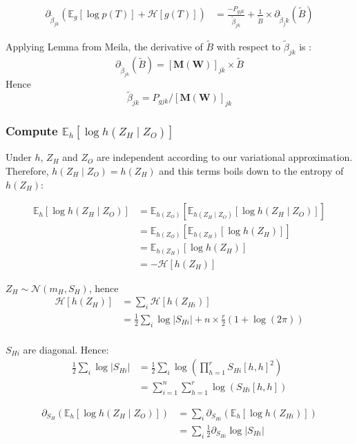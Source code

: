 \documentclass[11pt,a4paper]{article}
\newcommand{\Esp}{\mathds{E}}
\newcommand{\entr}{\mathcal{H}}
\begin{document}
\begin{align*}
\partial_{\widetilde{\beta}_{jk}} \left(\Esp_g[\log p(T)] + \entr[g(T)]\right) &= \frac{-P_{gjk}}{\widetilde{\beta}_{jk}} + \frac{1}{\widetilde{B}} \times \partial_{\widetilde{\beta}_jk} (\widetilde{B})
\end{align*}

Applying Lemma from Meila, the derivative of $\widetilde{B}$ with respect to $\widetilde{\beta}_{jk}$ is :
$$\partial_{\widetilde{\beta}_{jk}} (\widetilde{B}) = [\bm{M}(\bm{W})]_{jk} \times \widetilde{B}  $$
Hence
$$ \widetilde{\beta}_{jk} = P_{gjk}/[\bm{M}(\bm{W})]_{jk}$$
\subsubsection{Compute $\Esp_h[\log h(Z_H\mid Z_O)]$}
Under $h$, $Z_H$ and $Z_O$ are independent according to our variational approximation. Therefore, $h(Z_H\mid Z_O) = h(Z_H)$ and this terms boils down to the entropy of $h(Z_H)$:

\begin{align*}
\Esp_h[\log h(Z_H\mid Z_O)] &= \Esp_{h(Z_O)}\left[\Esp_{h(Z_H\mid Z_O)}[\log h(Z_H\mid Z_O)]\right]\\
&=\Esp_{h(Z_O)}\left[\Esp_{h(Z_H)}[\log h(Z_H)]\right]\\
&=\Esp_{h(Z_H)}[\log h(Z_H)] \\
&=-\entr[h(Z_H)]
\end{align*}


$Z_H \sim \mathcal{N}(m_H,S_H)$, hence 
\begin{align*}
\entr[h(Z_H)] &= \sum_i \entr[h(Z_{Hi})] \\
&=\frac{1}{2} \sum_i\log |S_{Hi}| +n\times  \frac{r}{2}(1+\log(2\pi))\\
\end{align*}

$S_{Hi}$ are diagonal. Hence:
\begin{align*}
\frac{1}{2} \sum_i\log |S_{Hi}| &= \frac{1}{2} \sum_i \log \left(\prod_{h=1}^r S_{Hi}[h,h]^2 \right)\\
&= \sum_{i=1}^n \sum_{h=1}^r \log(S_{Hi}[h,h])
\end{align*}

\begin{align*}
\partial_{S_H} (\Esp_h[\log h(Z_H\mid Z_O)]) &= \sum_i\partial_{S_{Hi}} (\Esp_h[\log h(Z_{Hi})])  \\
&=\sum_i \frac{1}{2} \partial_{S_{Hi}} \log |S_{Hi}|
\end{align*}
\end{document}
